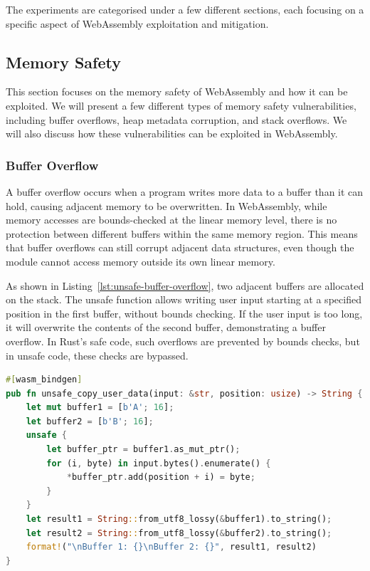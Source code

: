 \documentclass{article}
\begin{document}
The experiments are categorised under a few different sections, each focusing on a specific aspect of WebAssembly exploitation and mitigation.

\subsection{Memory Safety}
This section focuses on the memory safety of WebAssembly and how it can be exploited. We will present a few different types of memory safety vulnerabilities, including buffer overflows, heap metadata corruption, and stack overflows. We will also discuss how these vulnerabilities can be exploited in WebAssembly.

\subsubsection{Buffer Overflow}
A buffer overflow occurs when a program writes more data to a buffer than it can hold, causing adjacent memory to be overwritten. In WebAssembly, while memory accesses are bounds-checked at the linear memory level, there is no protection between different buffers within the same memory region. This means that buffer overflows can still corrupt adjacent data structures, even though the module cannot access memory outside its own linear memory.

As shown in Listing~\ref{lst:unsafe-buffer-overflow}, two adjacent buffers are allocated on the stack. The unsafe function allows writing user input starting at a specified position in the first buffer, without bounds checking. If the user input is too long, it will overwrite the contents of the second buffer, demonstrating a buffer overflow. In Rust's safe code, such overflows are prevented by bounds checks, but in unsafe code, these checks are bypassed.

\begin{lstlisting}[language=rust, float, caption={Unsafe buffer overflow example in Rust}, label={lst:unsafe-buffer-overflow}]
#[wasm_bindgen]
pub fn unsafe_copy_user_data(input: &str, position: usize) -> String {
    let mut buffer1 = [b'A'; 16];
    let buffer2 = [b'B'; 16];
    unsafe {
        let buffer_ptr = buffer1.as_mut_ptr();
        for (i, byte) in input.bytes().enumerate() {
            *buffer_ptr.add(position + i) = byte;
        }
    }
    let result1 = String::from_utf8_lossy(&buffer1).to_string();
    let result2 = String::from_utf8_lossy(&buffer2).to_string();
    format!("\nBuffer 1: {}\nBuffer 2: {}", result1, result2)
}
\end{lstlisting}
\end{document}
